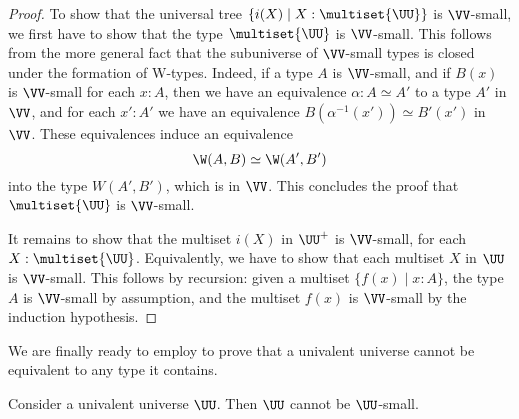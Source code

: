 \begin{proof}
  To show that the universal tree $\{i(X)\mid X:\multiset{\UU}\}$ is $\VV$-small, we first have to show that the type $\multiset{\UU}$ is $\VV$-small. This follows from the more general fact that the subuniverse of $\VV$-small types is closed under the formation of W-types. Indeed, if a type $A$ is $\VV$-small, and if $B(x)$ is $\VV$-small for each $x:A$, then we have an equivalence $\alpha:A\simeq A'$ to a type $A'$ in $\VV$, and for each $x':A'$ we have an equivalence $B(\alpha^{-1}(x'))\simeq B'(x')$ in $\VV$. These equivalences induce an equivalence
  \begin{equation*}
    \W(A,B)\simeq \W(A',B')
  \end{equation*}
  into the type $W(A',B')$, which is in $\VV$. This concludes the proof that $\multiset{\UU}$ is $\VV$-small.

  It remains to show that the multiset $i(X)$ in $\UU^+$ is $\VV$-small, for each $X:\multiset{\UU}$. Equivalently, we have to show that each multiset $X$ in $\UU$ is $\VV$-small. This follows by recursion: given a multiset $\{f(x)\mid x:A\}$, the type $A$ is $\VV$-small by assumption, and the multiset $f(x)$ is $\VV$-small by the induction hypothesis.
\end{proof}

We are finally ready to employ  to prove that a univalent universe cannot be equivalent to any type it contains.

\begin{thm}\label{thm:russell}
  Consider a univalent universe $\UU$. Then $\UU$ cannot be $\UU$-small.
\end{thm}

